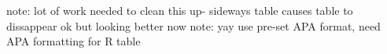 \documentclass[]{article}
\begin{document}
\centering



note: lot of work needed to clean this up- sideways table causes table to dissappear ok but looking better now
note: yay use pre-set APA format, need APA formatting for R table

\end{document}
